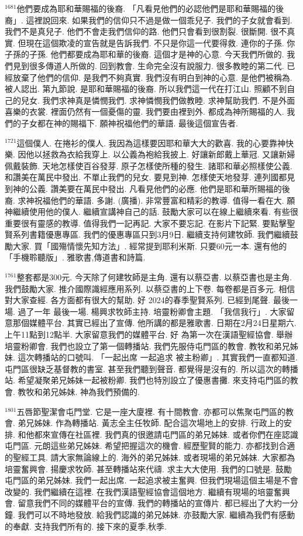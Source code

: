 \documentclass{book}
\begin{document}
$^{1681}$他們要成為耶和華賜福的後裔.
「凡看見他們的必認他們是耶和華賜福的後裔」.
這裡說回來.
如果我們的信仰只不過是做一個乖兒子.
我們的子女就會看到.
我們不是真兒子.
他們不會走我們信仰的路.
他們只會看到很割裂.
很斷開.
很不真實.
但現在這個欺凌的宣告就是告訴我們.
不只是你這一代要得救.
連你的子孫.
你子孫的子孫.
他們都要成為耶和華的後裔.
這個才是神的心意.
今天我們所做的.
我們見到很多傳道人所做的.
回到教會.
生命完全沒有說服力.
很多教睦的第二代.
已經放棄了他們的信仰.
是我們不夠真實.
我們沒有明白到神的心意.
是他們被稱為.
被人認出.
第九節說.
是耶和華賜福的後裔.
所以我們這一代在打江山.
照顧不到自己的兒女.
我們求神真是憐憫我們.
求神憐憫我們做教睦.
求神幫助我們.
不是外面喜樂的衣裳.
裡面仍然有一個憂傷的靈.
我們要由裡到外.
都成為神所賜福的人.
我們的子女都在神的賜福下.
願神祝福他們的華語.
最後這個宣告者.

$^{1721}$這個僕人.
在捲衫的僕人.
我因為這樣要因耶和華大大的歡喜.
我的心要靠神快樂.
因他以拯救為衣給我穿上.
以公義為袍給我披上.
好讓新郎戴上華冠.
又讓新婦佩戴裝飾.
天地怎樣使百谷發芽.
原子怎樣使所種的發生.
諸耶和華必照樣使公義.
和讚美在萬民中發出.
不單止我們的兒女.
要見到神.
怎樣使天地發芽.
連列國都見到神的公義.
讚美要在萬民中發出.
凡看見他們的必應.
他們是耶和華所賜福的後裔.
求神祝福他們的華語.
多謝.
(廣播).
非常豐富和精彩的教導.
值得一看在大.
願神繼續使用他的僕人.
繼續宣講神自己的話.
鼓勵大家可以在線上繼續來看.
有些很重要很有靈感的教導.
值得我們一記再記.
大家不要忘記.
在影片下記緊.
要點擊聖賢系列書籍優惠專區.
我們的優惠專區只到3月9日.
繼續支持何建牧師.
我們繼續鼓勵大家.
買「國殤情懷先知方法」.
經常提到耶利米斯.
只要60元一本.
還有他的「手機聆聽版」.
雅歌書,傳道書和詩篇.

$^{1761}$整套都是300元.
今天除了何建牧師是主角.
還有以蔡亞書.
以蔡亞書也是主角.
我們鼓勵大家.
推介國際識經應用系列.
以蔡亞書的上下卷.
每卷都是百多元.
相信對大家查經.
各方面都有很大的幫助.
好 2024的春季聖賢系列.
已經到尾聲.
最後一場.
過了一年 最後一場.
楊興求牧師主持.
培靈粉卿會主題.
「我信我行」.
大家留意那個媒體平台.
其實已經出了宣傳.
他所講的都是雅歌書.
日期在2月24日星期六.
上午11點到12點半.
大家留意我們的媒體平台.
好 為第一次在漢語聖經協會.
舉辦培靈粉卿會.
我們也設立了第一個轉播站.
我們先服侍屯門區的教會.
教牧和弟兄姊妹.
這次轉播站的口號叫.
「一起出席 一起追求 被主粉卿」.
其實我們一直都知道.
屯門區很缺乏基督教的書室.
甚至我們聽到聲音.
都覺得是沒有的.
所以這次的轉播站.
希望凝聚弟兄姊妹一起被粉卿.
我們也特別設立了優惠書攤.
來支持屯門區的教會.
教牧和弟兄姊妹.
神為我們預備的.

$^{1801}$五唇節聖潔會屯門堂.
它是一座大廈裡.
有十間教會.
亦都可以焦聚屯門區的教會.
弟兄姊妹.
作為轉播站.
黃志全主任牧師.
配合這次場地上的安排.
行政上的安排.
和他都來宣傳在社區裡.
我們真的很邀請屯門區的弟兄姊妹.
或者你們在座認識屯門區.
元朗這些弟兄姊妹.
希望把握這次的機會.
經歷聖賢的能力.
亦都找到合適的聖經工具.
請大家無論線上的.
海外的弟兄姊妹.
或者現場的弟兄姊妹.
大家都為培靈奮興會.
揚慶求牧師.
甚至轉播站來代禱.
求主大大使用.
我們的口號是.
鼓勵屯門區的弟兄姊妹.
我們一起出席.
一起追求被主奮興.
但我們現場這個主場是不會改變的.
我們繼續在這裡.
在我們漢語聖經協會這個地方.
繼續有現場的培靈奮興會.
留意我們不同的媒體平台的宣傳.
我們的轉播站的宣傳片.
都已經出了大約一分鐘.
我們可以不時地發放.
給我們認識的弟兄姊妹.
亦鼓勵大家.
繼續為我們有感動的奉獻.
支持我們所有的.
接下來的夏季,秋季.
\end{document}
